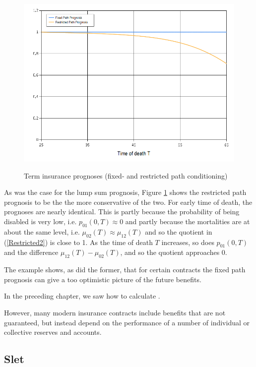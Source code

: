 \documentclass{book}
\newcommand{\1}[1]{\mathbbm{1}_{\left\lbrace #1 \right\rbrace}}
\theoremstyle{break}
\theoremstyle{remark}
\numberwithin{equation}{section}
\begin{document}
\begin{figure}[H]
	\centering
	\caption{Term insurance prognoses (fixed- and restricted path conditioning)}
	\includegraphics[width=\textwidth]{Term} \label{Term}
\end{figure}

As was the case for the lump sum prognosis, Figure \ref{Term} shows the restricted path prognosis to be the the more conservative of the two. For early time of death, the prognoses are nearly identical. This is partly because the probability of being disabled is very low, i.e. $p_{01}(0,T) \approx 0$ and partly because the mortalities are at about the same level, i.e. $\mu_{02}(T) \approx \mu_{12}(T)$ and so the quotient in (\ref{Restricted2}) is close to 1. As the time of death $T$ increases, so does $p_{01}(0,T)$ and the difference $\mu_{12}(T) - \mu_{02}(T)$, and so the quotient approaches 0.

The example shows, as did the former, that for certain contracts the fixed path prognosis can give a too optimistic picture of the future benefits.

In the preceding chapter, we saw how to calculate .

However, many modern insurance contracts include benefits that are not guaranteed, but instead depend on the performance of a number of individual or collective reserves and accounts. 

\subsection{Slet}
\end{document}
